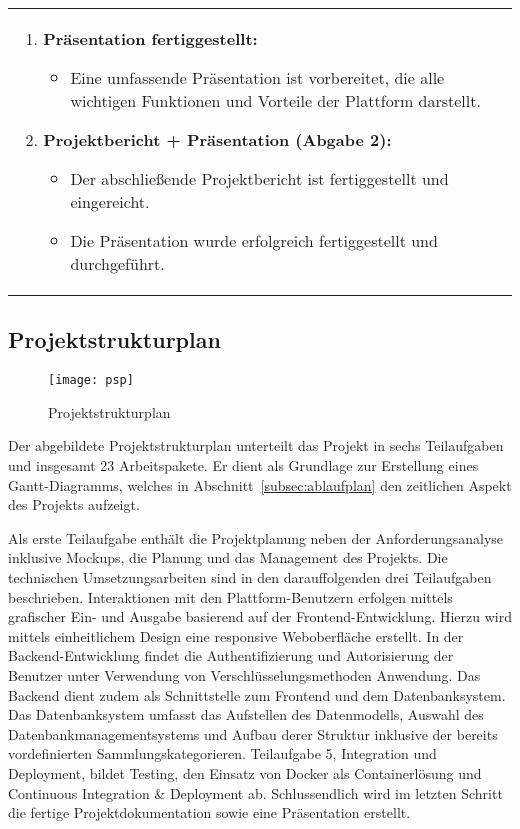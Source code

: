 \begin{tabularx}{\textwidth}{L R}
\begin{enumerate}[left=0pt,label=\arabic*.,itemsep=0.4cm]
            \item \textbf{Präsentation fertiggestellt:}
            \begin{itemize}[label=--]
                \item Eine umfassende Präsentation ist vorbereitet, die alle wichtigen Funktionen und Vorteile der Plattform darstellt.
            \end{itemize}

            \item \textbf{Projektbericht + Präsentation (Abgabe 2):}
            \begin{itemize}[label=--]
                \item Der abschließende Projektbericht ist fertiggestellt und eingereicht.
                \item Die Präsentation wurde erfolgreich fertiggestellt und durchgeführt.
            \end{itemize}
        \end{enumerate}
    \end{tabularx}


\subsection{Projektstrukturplan}\label{subsec:projektstrukturplan}

\begin{figure}[H]
    \centering
    \texttt{[image: psp]}
    \caption{Projektstrukturplan}\label{fig:projektstrukturplan}
\end{figure}

Der abgebildete Projektstrukturplan unterteilt das Projekt in sechs Teilaufgaben und insgesamt 23 Arbeitspakete.
Er dient als Grundlage zur Erstellung eines Gantt-Diagramms, welches in Abschnitt~\ref{subsec:ablaufplan} den zeitlichen Aspekt des Projekts aufzeigt.

Als erste Teilaufgabe enthält die Projektplanung neben der Anforderungsanalyse inklusive Mockups, die Planung und das Management des Projekts.
Die technischen Umsetzungsarbeiten sind in den darauffolgenden drei Teilaufgaben beschrieben.
Interaktionen mit den Plattform-Benutzern erfolgen mittels grafischer Ein- und Ausgabe basierend auf der Frontend-Entwicklung.
Hierzu wird mittels einheitlichem Design eine responsive Weboberfläche erstellt.
In der Backend-Entwicklung findet die Authentifizierung und Autorisierung der Benutzer unter Verwendung von Verschlüsselungsmethoden Anwendung.
Das Backend dient zudem als Schnittstelle zum Frontend und dem Datenbanksystem.
Das Datenbanksystem umfasst das Aufstellen des Datenmodells, Auswahl des Datenbankmanagementsystems und Aufbau derer Struktur inklusive der bereits vordefinierten Sammlungskategorieren.
Teilaufgabe 5, Integration und Deployment, bildet Testing, den Einsatz von Docker als Containerlösung und Continuous Integration \& Deployment ab.
Schlussendlich wird im letzten Schritt die fertige Projektdokumentation sowie eine Präsentation erstellt.


